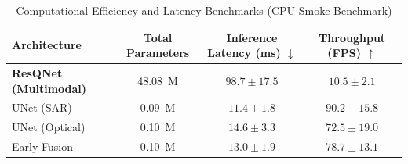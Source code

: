 \begin{table}[h]
\centering
\caption{Computational Efficiency and Latency Benchmarks (CPU Smoke Benchmark)}
\label{tab:efficiency}
\begin{tabular}{lccc}
\toprule
Architecture & Total Parameters & Inference Latency (ms) $\downarrow$ & Throughput (FPS) $\uparrow$ \\
\midrule
\textbf{ResQNet (Multimodal)} & 48.08~M & $98.7 \pm 17.5$ & $10.5 \pm 2.1$ \\
UNet (SAR) & 0.09~M & $11.4 \pm 1.8$ & $90.2 \pm 15.8$ \\
UNet (Optical) & 0.10~M & $14.6 \pm 3.3$ & $72.5 \pm 19.0$ \\
Early Fusion & 0.10~M & $13.0 \pm 1.9$ & $78.7 \pm 13.1$ \\
\bottomrule
\end{tabular}
\end{table}